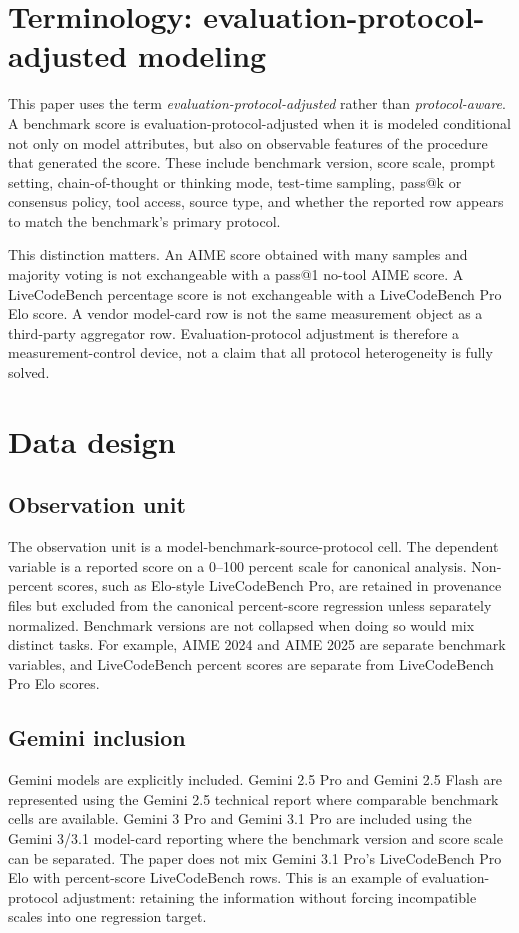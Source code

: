 \documentclass[11pt]{article}
\begin{document}
\section{Terminology: evaluation-protocol-adjusted modeling}
This paper uses the term \emph{evaluation-protocol-adjusted} rather than \emph{protocol-aware}.  A benchmark score is evaluation-protocol-adjusted when it is modeled conditional not only on model attributes, but also on observable features of the procedure that generated the score.  These include benchmark version, score scale, prompt setting, chain-of-thought or thinking mode, test-time sampling, pass@k or consensus policy, tool access, source type, and whether the reported row appears to match the benchmark's primary protocol.

This distinction matters.  An AIME score obtained with many samples and majority voting is not exchangeable with a pass@1 no-tool AIME score.  A LiveCodeBench percentage score is not exchangeable with a LiveCodeBench Pro Elo score.  A vendor model-card row is not the same measurement object as a third-party aggregator row.  Evaluation-protocol adjustment is therefore a measurement-control device, not a claim that all protocol heterogeneity is fully solved.

\section{Data design}
\subsection{Observation unit}
The observation unit is a model-benchmark-source-protocol cell.  The dependent variable is a reported score on a 0--100 percent scale for canonical analysis.  Non-percent scores, such as Elo-style LiveCodeBench Pro, are retained in provenance files but excluded from the canonical percent-score regression unless separately normalized.  Benchmark versions are not collapsed when doing so would mix distinct tasks.  For example, AIME 2024 and AIME 2025 are separate benchmark variables, and LiveCodeBench percent scores are separate from LiveCodeBench Pro Elo scores.

\subsection{Gemini inclusion}
Gemini models are explicitly included.  Gemini 2.5 Pro and Gemini 2.5 Flash are represented using the Gemini 2.5 technical report where comparable benchmark cells are available.  Gemini 3 Pro and Gemini 3.1 Pro are included using the Gemini 3/3.1 model-card reporting where the benchmark version and score scale can be separated.  The paper does not mix Gemini 3.1 Pro's LiveCodeBench Pro Elo with percent-score LiveCodeBench rows.  This is an example of evaluation-protocol adjustment: retaining the information without forcing incompatible scales into one regression target.
\end{document}
